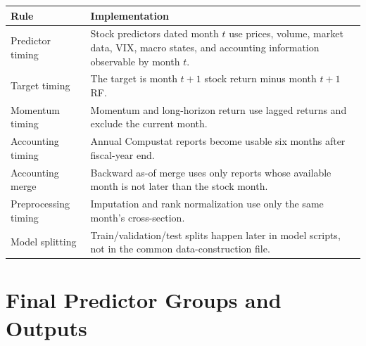 \documentclass[11pt,a4paper]{article}
\begin{document}
\begin{center}
\begin{tabularx}{\textwidth}{p{4.0cm}Y}
\toprule
Rule & Implementation \\
\midrule
Predictor timing & Stock predictors dated month $t$ use prices, volume, market data, VIX, macro states, and accounting information observable by month $t$. \\
Target timing & The target is month $t+1$ stock return minus month $t+1$ RF. \\
Momentum timing & Momentum and long-horizon return use lagged returns and exclude the current month. \\
Accounting timing & Annual Compustat reports become usable six months after fiscal-year end. \\
Accounting merge & Backward as-of merge uses only reports whose available month is not later than the stock month. \\
Preprocessing timing & Imputation and rank normalization use only the same month's cross-section. \\
Model splitting & Train/validation/test splits happen later in model scripts, not in the common data-construction file. \\
\bottomrule
\end{tabularx}
\end{center}

\section{Final Predictor Groups and Outputs}
\end{document}
